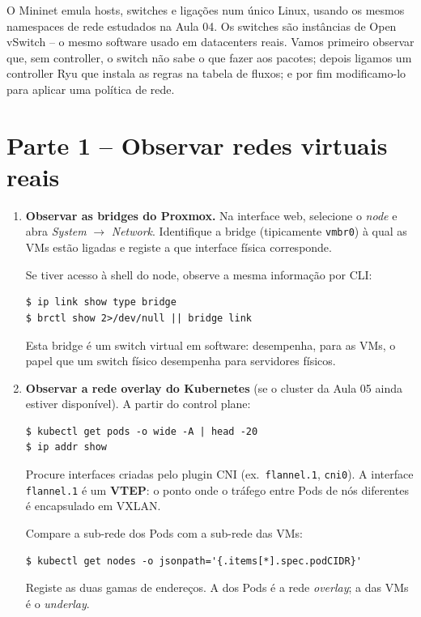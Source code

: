 \documentclass[11pt,a4paper]{article}
\begin{document}
O Mininet emula hosts, switches e ligações num único Linux, usando os mesmos namespaces de rede estudados na Aula 04. Os switches são instâncias de Open vSwitch -- o mesmo software usado em datacenters reais. Vamos primeiro observar que, sem controller, o switch não sabe o que fazer aos pacotes; depois ligamos um controller Ryu que instala as regras na tabela de fluxos; e por fim modificamo-lo para aplicar uma política de rede.

\section{Parte 1 -- Observar redes virtuais reais}
\begin{enumerate}[label=\arabic*.]

  \item \textbf{Observar as bridges do Proxmox.} Na interface web, selecione o \emph{node} e abra \emph{System} $\rightarrow$ \emph{Network}. Identifique a bridge (tipicamente \texttt{vmbr0}) à qual as VMs estão ligadas e registe a que interface física corresponde.

  Se tiver acesso à shell do node, observe a mesma informação por CLI:
\begin{lstlisting}
$ ip link show type bridge
$ brctl show 2>/dev/null || bridge link
\end{lstlisting}
  Esta bridge é um switch virtual em software: desempenha, para as VMs, o papel que um switch físico desempenha para servidores físicos.

  \item \textbf{Observar a rede overlay do Kubernetes} (se o cluster da Aula 05 ainda estiver disponível). A partir do control plane:
\begin{lstlisting}
$ kubectl get pods -o wide -A | head -20
$ ip addr show
\end{lstlisting}
  Procure interfaces criadas pelo plugin CNI (ex.\ \texttt{flannel.1}, \texttt{cni0}). A interface \texttt{flannel.1} é um \textbf{VTEP}: o ponto onde o tráfego entre Pods de nós diferentes é encapsulado em VXLAN.

  Compare a sub-rede dos Pods com a sub-rede das VMs:
\begin{lstlisting}
$ kubectl get nodes -o jsonpath='{.items[*].spec.podCIDR}'
\end{lstlisting}
  Registe as duas gamas de endereços. A dos Pods é a rede \emph{overlay}; a das VMs é o \emph{underlay}.

\end{enumerate}
\end{document}
